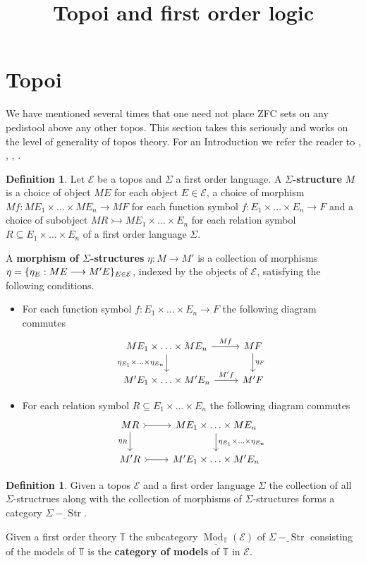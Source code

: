 \documentclass[12pt]{article}
\title{Topoi and first order logic}
\theoremstyle{plain}
\theoremstyle{definition}
\newtheorem{defn}[thm]{Definition} %
\newcommand{\bb}[1]{\mathbb{#1}}
\newcommand{\call}[1]{\mathcal{#1}}
\newcommand{\lto}{\longrightarrow}
\begin{document}
\section{Topoi}
We have mentioned several times that one need not place ZFC sets on any pedistool above any other topos. This section takes this seriously and works on the level of generality of topos theory. For an Introduction we refer the reader to \cite{TroianiThesis}, \cite{TroianiColimits}, \cite{Johnstone}, \cite{MM}.

\begin{defn}
	Let $\call{E}$ be a topos and $\Sigma$ a first order language. A \textbf{$\Sigma$-structure} $M$ is a choice of object $ME$ for each object $E \in \call{E}$, a choice of morphism $Mf: ME_1 \times \ldots \times ME_n \lto MF$ for each function symbol $f: E_1 \times \ldots \times E_n \lto F$ and a choice of subobject $MR \rightarrowtail ME_1 \times \ldots \times E_n$ for each relation symbol $R \subseteq E_1 \times \ldots \times E_n$ of a first order language $\Sigma$.
	
	A \textbf{morphism of $\Sigma$-structures} $\eta: M \lto M'$ is a collection of morphisms $\eta = \{ \eta_E: ME \lto M'E \}_{E \in \cal{E}}$, indexed by the objects of $\call{E}$, satisfying the following conditions.
	\begin{itemize}
		\item For each function symbol $f: E_1 \times \ldots \times E_n \lto F$ the following diagram commutes
		\begin{equation}
			\begin{tikzcd}
				ME_1 \times \ldots \times ME_n\arrow[r,"{Mf}"]\arrow[d,swap,"{\eta_{E_1} \times \ldots \times \eta_{E_n}}"] & MF\arrow[d,"{\eta_F}"]\\
				M'E_1 \times \ldots \times M'E_n\arrow[r,"{M'f}"] & M'F
			\end{tikzcd}
		\end{equation}
		\item For each relation symbol $R \subseteq E_1 \times \ldots \times E_n$ the following diagram commutes
		\begin{equation}
			\begin{tikzcd}
				MR\arrow[r,rightarrowtail]\arrow[d,swap,"{\eta_R}"] & ME_1 \times \ldots \times ME_n\arrow[d,"{\eta_{E_1} \times \ldots \times \eta_{E_n}}"]\\
				M'R\arrow[r,rightarrowtail] & M'E_1 \times \ldots \times M'E_n
			\end{tikzcd}
		\end{equation}
	\end{itemize}
\end{defn}

\begin{defn}
	Given a topos $\call{E}$ and a first order language $\Sigma$ the collection of all $\Sigma$-structrues along with the collection of morphisms of $\Sigma$-structures forms a category $\underline{\Sigma-\operatorname{Str}}$.
	
	Given a first order theory $\bb{T}$ the subcategory $\underline{\operatorname{Mod}_{\bb{T}}}(\call{E})$ of $\underline{\Sigma-\operatorname{Str}}$ consisting of the models of $\bb{T}$ is the \textbf{category of models} of $\bb{T}$ in $\call{E}$.
\end{defn}
\end{document}

